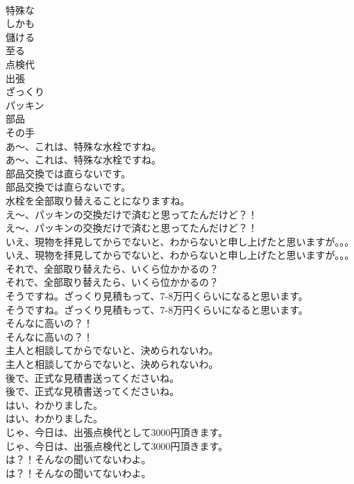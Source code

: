 \documentclass[8pt]{extreport}
\begin{document}
\begin{CJK}{UTF8}{min}
\\	特殊な
\\	しかも
\\	儲ける
\\	至る
\\	点検代
\\	出張
\\	ざっくり
\\	パッキン
\\	部品
\\	その手
\\	あ～、これは、特殊な水栓ですね。	
\\	あ～、これは、特殊な水栓ですね。 
\\	部品交換では直らないです。	
\\	部品交換では直らないです。 
\\	水栓を全部取り替えることになりますね。	
\\	え～、パッキンの交換だけで済むと思ってたんだけど？！	
\\	え～、パッキンの交換だけで済むと思ってたんだけど？！ 
\\	いえ、現物を拝見してからでないと、わからないと申し上げたと思いますが。。。	
\\	いえ、現物を拝見してからでないと、わからないと申し上げたと思いますが。。。 
\\	それで、全部取り替えたら、いくら位かかるの？	
\\	それで、全部取り替えたら、いくら位かかるの？ 
\\	そうですね。ざっくり見積もって、7-8万円くらいになると思います。	
\\	そうですね。ざっくり見積もって、7-8万円くらいになると思います。 
\\	そんなに高いの？！	
\\	そんなに高いの？！ 
\\	主人と相談してからでないと、決められないわ。	
\\	主人と相談してからでないと、決められないわ。 
\\	後で、正式な見積書送ってくださいね。	
\\	後で、正式な見積書送ってくださいね。 
\\	はい、わかりました。	
\\	はい、わかりました。 
\\	じゃ、今日は、出張点検代として3000円頂きます。	
\\	じゃ、今日は、出張点検代として3000円頂きます。 
\\	は？！そんなの聞いてないわよ。	
\\	は？！そんなの聞いてないわよ。 

\end{CJK}
\end{document}
